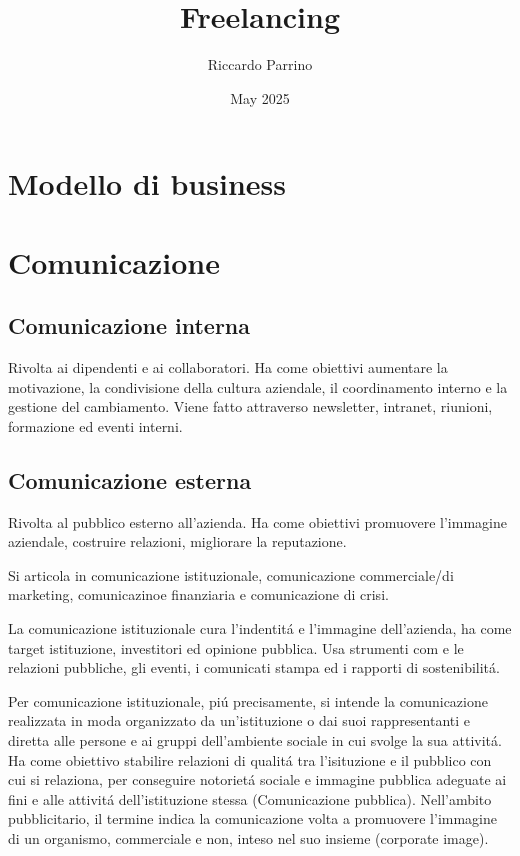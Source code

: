 \documentclass{article}
\title{Freelancing}
\author{Riccardo Parrino}
\date{May 2025}
\begin{document}
\maketitle

\section{Modello di business}

\section{Comunicazione}

\subsection{Comunicazione interna}
Rivolta ai dipendenti e ai collaboratori. Ha come obiettivi aumentare la motivazione, la condivisione della cultura aziendale, il coordinamento interno e la gestione del cambiamento. Viene fatto attraverso newsletter, intranet, riunioni, formazione ed eventi interni.

\subsection{Comunicazione esterna}
Rivolta al pubblico esterno all'azienda. Ha come obiettivi promuovere l'immagine aziendale, costruire relazioni, migliorare la reputazione.

Si articola in comunicazione istituzionale, comunicazione commerciale/di marketing, comunicazinoe finanziaria e comunicazione di crisi.

La comunicazione istituzionale cura l'indentit\'a e l'immagine dell'azienda,  ha come target istituzione, investitori ed opinione pubblica. Usa strumenti com e le relazioni pubbliche, gli eventi, i comunicati stampa ed i rapporti di sostenibilit\'a.

Per comunicazione istituzionale, pi\'u precisamente, si intende la comunicazione realizzata in moda organizzato da un'istituzione o dai suoi rappresentanti e diretta alle persone e ai gruppi dell'ambiente sociale in cui svolge la sua attivit\'a. Ha come obiettivo stabilire relazioni di qualit\'a tra l'isituzione e il pubblico con cui si relaziona, per conseguire notoriet\'a sociale e immagine pubblica adeguate ai fini e alle attivit\'a dell'istituzione stessa (Comunicazione pubblica). Nell'ambito pubblicitario, il termine indica la comunicazione volta a promuovere l'immagine di un organismo, commerciale e non, inteso nel suo insieme (corporate image).
\end{document}
